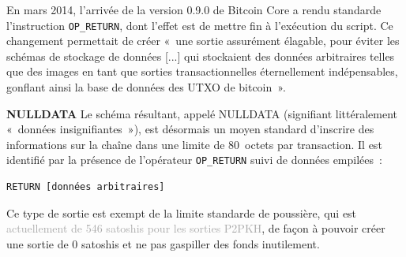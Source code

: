 En mars 2014, l'arrivée de la version 0.9.0 de Bitcoin Core a rendu standarde l'instruction \texttt{OP\_RETURN}, dont l'effet est de mettre fin à l'exécution du script. Ce changement permettait de créer «~une sortie assurément élagable, pour éviter les schémas de stockage de données [...] qui stockaient des données arbitraires telles que des images en tant que sorties transactionnelles éternellement indépensables, gonflant ainsi la base de données des UTXO de bitcoin~». %

\textbf{NULLDATA} Le schéma résultant, appelé NULLDATA (signifiant littéralement «~données insignifiantes~»), est désormais un moyen standard d'inscrire des informations sur la chaîne dans une limite de 80~octets par transaction. Il est identifié par la présence de l'opérateur \texttt{OP\_RETURN} suivi de données empilées~:

\begin{Verbatim}[fontsize=\small]
RETURN [données arbitraires]
\end{Verbatim}

Ce type de sortie est exempt de la limite standarde de poussière, qui est \textcolor{darkgray}{actuellement de 546 satoshis pour les sorties P2PKH}, de façon à pouvoir créer une sortie de 0 satoshis et ne pas gaspiller des fonds inutilement.

